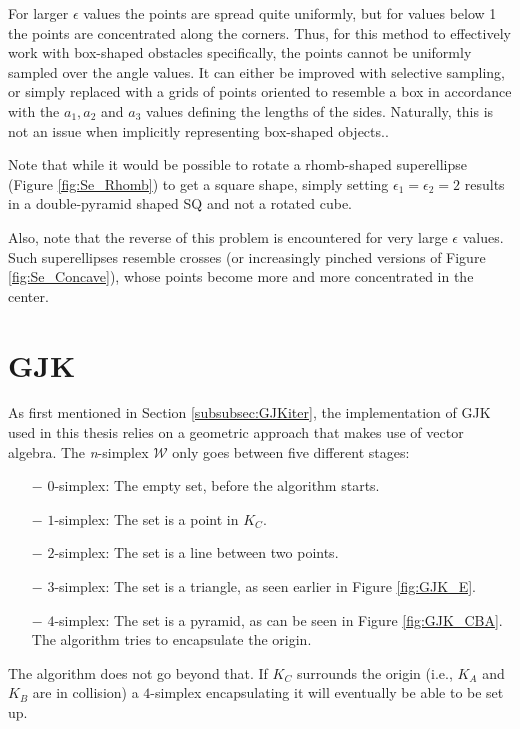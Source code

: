 For larger $\epsilon$ values the points are spread quite uniformly, but for values below 1 the points are concentrated along the corners. Thus, for this method to effectively work with box-shaped obstacles specifically, the points cannot be uniformly sampled over the angle values. It can either be improved with selective sampling, or simply replaced with a grids of points oriented to resemble a box in accordance with the $a_1, a_2$ and $a_3$ values defining the lengths of the sides. Naturally, this is not an issue when implicitly representing box-shaped objects..

Note that while it would be possible to rotate a rhomb-shaped superellipse (Figure \ref{fig:Se_Rhomb}) to get a square shape, simply setting $\epsilon_1=\epsilon_2=2$ results in a double-pyramid shaped \gls{SQ} and not a rotated cube.

Also, note that the reverse of this problem is encountered for very large $\epsilon$ values. Such superellipses resemble crosses (or increasingly pinched versions of Figure \ref{fig:Se_Concave}), whose points become more and more concentrated in the center.


\section{GJK}
As first mentioned in Section \ref{subsubsec:GJKiter}, the implementation of \gls{GJK} used in this thesis relies on a geometric approach that makes use of vector algebra. The \textit{n}-simplex $\mathcal{W}$ only goes between five different stages:

\begin{enumerate}
	\item[$-$] $0$-simplex: The empty set, before the algorithm starts.
	\item[$-$] $1$-simplex: The set is a point in $K_C$.
	\item[$-$] $2$-simplex: The set is a line between two points.
	\item[$-$] $3$-simplex: The set is a triangle, as seen earlier in Figure \ref{fig:GJK_E}.
	\item[$-$] $4$-simplex: The set is a pyramid, as can be seen in Figure \ref{fig:GJK_CBA}. The algorithm tries to encapsulate the origin.
\end{enumerate}

The algorithm does not go beyond that. If $K_C$ surrounds the origin (i.e., $K_A$ and $K_B$ are in collision) a $4$-simplex encapsulating it will eventually be able to be set up.

